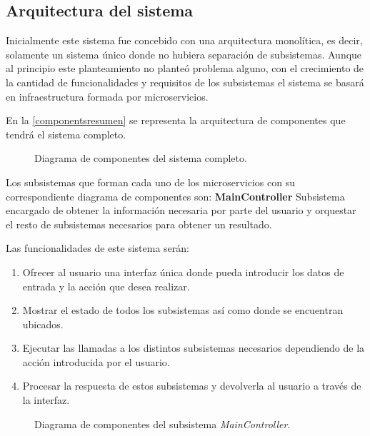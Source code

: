 \documentclass[../main.tex]{subfiles}
\begin{document}
\subsection{Arquitectura del sistema}\label{subsec:arquitectura_sistema}
Inicialmente este sistema fue concebido con una arquitectura monolítica, es decir, solamente un sistema único donde no hubiera separación de subsistemas. Aunque al principio este planteamiento no planteó problema alguno, con el crecimiento de la cantidad de funcionalidades y requisitos de los subsistemas el sistema se basará en infraestructura formada por microservicios.

En la \autoref{componentsresumen} se representa la arquitectura de componentes que tendrá el sistema completo.

\begin{figure}[H]
    \centering
    
    \caption{Diagrama de componentes del sistema completo.}
    \label{componentsresumen}
\end{figure}

Los subsistemas que forman cada uno de los microservicios con su correspondiente diagrama de componentes son:
\textbf{MainController}\label{par:maincontroller}
Subsistema encargado de obtener la información necesaria por parte del usuario y orquestar el resto de subsistemas necesarios para obtener un resultado.

Las funcionalidades de este sistema serán:
\begin{enumerate}
    \item Ofrecer al usuario una interfaz única donde pueda introducir los datos de entrada y la acción que desea realizar.
    \item Mostrar el estado de todos los subsistemas así como donde se encuentran ubicados.
    \item Ejecutar las llamadas a los distintos subsistemas necesarios dependiendo de la acción introducida por el usuario.
    \item Procesar la respuesta de estos subsistemas y devolverla al usuario a través de la interfaz.
\end{enumerate}

\begin{figure}[H]
    \centering
    
    \label{fig:components_main}
    \caption{Diagrama de componentes del subsistema \textit{MainController}.}
\end{figure}
\end{document}
